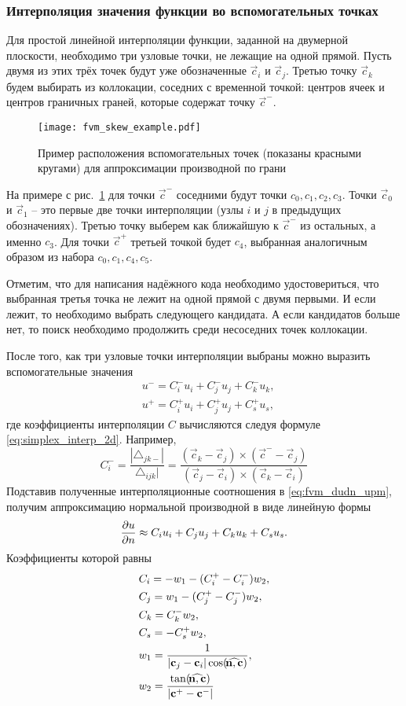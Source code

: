 \subsubsection{Интерполяция значения функции во вспомогательных точках}
Для простой линейной интерполяции функции, заданной на двумерной плоскости,
необходимо три узловые точки, не лежащие на одной прямой.
Пусть двумя из этих трёх точек будут уже обозначенные $\vec c_i$ и $\vec c_j$.
Третью точку $\vec c_k$ будем выбирать из коллокации, 
соседних с временной точкой:
центров ячеек и центров граничных граней, которые содержат точку $\vec c^-$.

\begin{figure}[h!]
\centering
\texttt{[image: fvm\_skew\_example.pdf]}
\caption{Пример расположения вспомогательных точек (показаны красными кругами) для аппроксимации производной по грани}
\label{fig:fvm_skew_example}
\end{figure}

На примере с рис.~\ref{fig:fvm_skew_example} для точки $\vec c^-$ соседними будут точки $c_0, c_1, c_2, c_3$.
Точки $\vec c_0$ и $\vec c_1$ -- это первые две точки интерполяции (узлы $i$ и $j$ в предыдущих обозначениях).
Третью точку выберем как ближайшую к $\vec c^-$ из остальных, а именно $c_3$.
Для точки $\vec c^+$ третьей точкой будет $c_4$, выбранная аналогичным образом
из набора $c_0, c_1, c_4, c_5$.

Отметим, что для написания надёжного кода необходимо удостовериться,
что выбранная третья точка не лежит на одной прямой с двумя первыми.
И если лежит, то необходимо выбрать следующего кандидата.
А если кандидатов больше нет, то поиск необходимо продолжить
среди несоседних точек коллокации.

После того, как три узловые точки интерполяции
выбраны можно выразить вспомогательные значения
\begin{align*}
&u^- = C^-_i u_i + C^-_j u_j + C^-_k u_k,\\
&u^+ = C^+_i u_i + C^+_j u_j + C^+_s u_s,
\end{align*}
где коэффициенты интерполяции $C$ вычисляются следуя формуле
\cref{eq:simplex_interp_2d}. Например,
$$
C^-_i = \frac{|\triangle_{jk-}|}{\triangle_{ijk}|} =
\frac{
(\vec c_k - \vec c_j)\times(\vec c^- - \vec c_j)
}{
(\vec c_j - \vec c_i)\times(\vec c_k - \vec c_i)
}
$$
Подставив полученные интерполяционные соотношения в \cref{eq:fvm_dudn_upm},
получим аппроксимацию нормальной производной в виде линейную формы
\begin{equation}
\label{eq:fvm_dudn_linform}
\frac{\partial u}{\partial n} \approx C_i u_i + C_j u_j + C_k u_k + C_s u_s.
\end{equation}
Коэффициенты которой равны
\begin{align*}
&C_i = -w_1 - (C_i^+ - C_i^-)w_2,
\\
&C_j = w_1 - (C_j^+ - C_j^-)w_2,
\\
&C_k = C_k^- w_2,
\\
&C_s = -C_s^+ w_2,
\\
&w_1 = \frac{1}{|\vec c_j - \vec c_i|\cos(\vecangle{n}{c})},
\\
&w_2 = \frac{\tan(\vecangle{n}{c})}{|\vec c^+ - \vec c^-|}
\end{align*}

